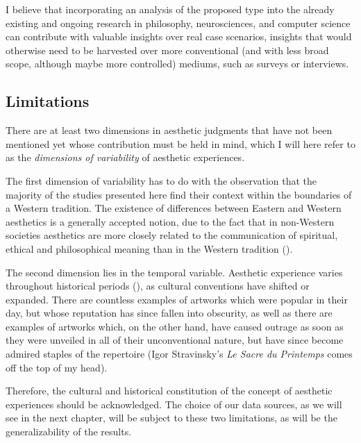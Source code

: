 I believe that incorporating an analysis of the proposed type into the already existing and ongoing research in philosophy, neurosciences, and computer science can contribute with valuable insights over real case scenarios, insights that would otherwise need to be harvested over more conventional (and with less broad scope, although maybe more controlled) mediums, such as surveys or interviews.

\subsection{Limitations}\label{subsec:limits}
There are at least two dimensions in aesthetic judgments that have not been mentioned yet whose contribution must be held in mind, which I will here refer to as the \emph{dimensions of variability} of aesthetic experiences.

The first dimension of variability has to do with the observation that the majority of the studies presented here find their context within the boundaries of a Western tradition. The existence of differences between Eastern and Western aesthetics is a generally accepted notion, due to the fact that in non-Western societies aesthetics are more closely related to the communication of spiritual, ethical and philosophical meaning than in the Western tradition (\cite{anderson1989comparative}).

The second dimension lies in the temporal variable. Aesthetic experience varies throughout historical periods (\cite{pearce2016neuroaesthetics}), as cultural conventions have shifted or expanded. There are countless examples of artworks which
were popular in their day, but whose reputation has since fallen into obscurity, as well as there are examples of artworks which, on the other hand, have caused outrage  as soon as they were unveiled in all of their unconventional nature, but have since become admired staples of the repertoire (Igor Stravinsky's \emph{Le Sacre du Printemps} comes off the top of my head).

Therefore, the cultural and historical constitution of the concept of aesthetic experiences should be acknowledged. The choice of our data sources, as we will see in the next chapter, will be subject to these two limitations, as will be the generalizability of the results.

